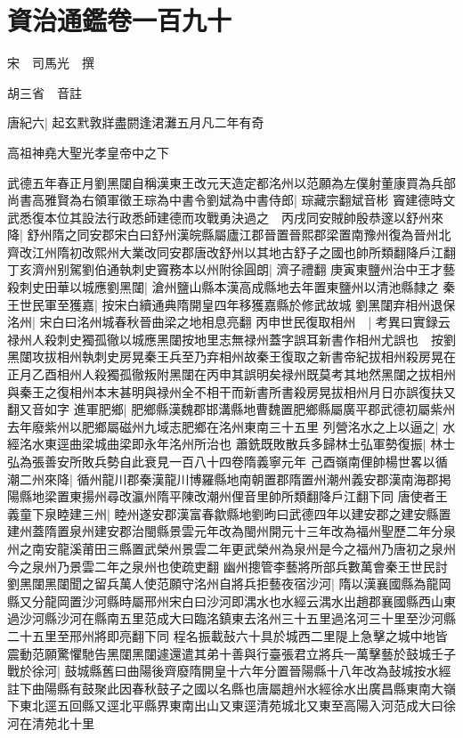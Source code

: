 \chapter{資治通鑑卷一百九十}
宋　司馬光　撰

胡三省　音註

唐紀六|{
	起玄黓敦牂盡閼逢涒灘五月凡二年有奇}


高祖神堯大聖光孝皇帝中之下

武德五年春正月劉黑闥自稱漢東王改元天造定都洺州以范願為左僕射董康買為兵部尚書高雅賢為右領軍徵王琮為中書令劉斌為中書侍郎|{
	琮藏宗翻斌音彬}
竇建德時文武悉復本位其設法行政悉師建德而攻戰勇決過之　丙戌同安賊帥殷恭邃以舒州來降|{
	舒州隋之同安郡宋白曰舒州漢皖縣屬廬江郡晉置晉熙郡梁置南豫州復為晉州北齊改江州隋初改熙州大業改同安郡唐改舒州以其地古舒子之國也帥所類翻降戶江翻}
丁亥濟州别駕劉伯通執刺史竇務本以州附徐圓朗|{
	濟子禮翻}
庚寅東鹽州治中王才藝殺刺史田華以城應劉黑闥|{
	滄州鹽山縣本漢高成縣地去年置東鹽州以清池縣隸之}
秦王世民軍至獲嘉|{
	按宋白續通典隋開皇四年移獲嘉縣於修武故城}
劉黑闥弃相州退保洺州|{
	宋白曰洺州城春秋晉曲梁之地相息亮翻}
丙申世民復取相州　|{
	考異曰實録云禄州人殺刺史獨孤徹以城應黑闥按地里志無禄州蓋字誤耳新書作相州尤誤也　按劉黑闥攻拔相州執刺史房晃秦王兵至乃弃相州故秦王復取之新書帝紀拔相州殺房晃在正月乙酉相州人殺獨孤徹叛附黑闥在丙申其誤明矣禄州既莫考其地然黑闥之拔相州與秦王之復相州本末甚明與禄州全不相干而新書所書殺房晃拔相州月日亦誤復扶又翻又音如字}
進軍肥鄉|{
	肥鄉縣漢魏郡邯溝縣地曹魏置肥鄉縣屬廣平郡武德初屬紫州去年廢紫州以肥鄉屬磁州九域志肥鄉在洺州東南三十五里}
列營洺水之上以逼之|{
	水經洺水東逕曲梁城曲梁即永年洺州所治也}
蕭銑既敗散兵多歸林士弘軍勢復振|{
	林士弘為張善安所敗兵勢自此衰見一百八十四卷隋義寧元年}
己酉嶺南俚帥楊世畧以循潮二州來降|{
	循州龍川郡秦漢龍川博羅縣地南朝置郡隋置州潮州義安郡漢南海郡掲陽縣地梁置東揚州尋改瀛州隋平陳改潮州俚音里帥所類翻降戶江翻下同}
唐使者王義童下泉睦建三州|{
	睦州遂安郡漢富春歙縣地劉昫曰武德四年以建安郡之建安縣置建州蓋隋置泉州建安郡治閩縣景雲元年改為閩州開元十三年改為福州聖歷二年分泉州之南安龍溪莆田三縣置武榮州景雲二年更武榮州為泉州是今之福州乃唐初之泉州今之泉州乃景雲二年之泉州也使疏吏翻}
幽州摠管李藝將所部兵數萬會秦王世民討劉黑闥黑闥聞之留兵萬人使范願守洺州自將兵拒藝夜宿沙河|{
	隋以漢襄國縣為龍岡縣又分龍岡置沙河縣時屬邢州宋白曰沙河即湡水也水經云湡水出趙郡襄國縣西山東過沙河縣沙河在縣南五里范成大曰臨洺鎮東去洺州三十五里過洺河三十里至沙河縣二十五里至邢州將即亮翻下同}
程名振載鼔六十具於城西二里隄上急擊之城中地皆震動范願驚懼馳告黑闥黑闥遽還遣其弟十善與行臺張君立將兵一萬擊藝於鼓城壬子戰於徐河|{
	鼓城縣舊曰曲陽後齊廢隋開皇十六年分置晉陽縣十八年改為鼔城按水經註下曲陽縣有鼓聚此因春秋鼓子之國以名縣也唐屬趙州水經徐水出廣昌縣東南大嶺下東北逕五回縣又逕北平縣界東南出山又東逕清苑城北又東至高陽入河范成大曰徐河在清苑北十里}
